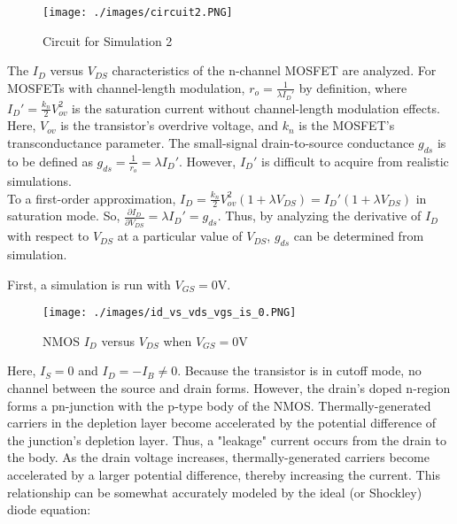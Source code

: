 \FloatBarrier

\begin{figure}[h!]
	\centering
	\texttt{[image: ./images/circuit2.PNG]}
	\caption{Circuit for Simulation 2}
	\label{fig:circuit2}
\end{figure}

\FloatBarrier

The $I_{D}$ versus $V_{DS}$ characteristics of the n-channel MOSFET are analyzed.
For MOSFETs with channel-length modulation, $r_{o} = \frac{1}{\lambda I_{D}'}$ by definition, where $I_{D}' = \frac{k_{n}}{2} V_{ov}^2$ is the saturation current without channel-length modulation effects.
Here, $V_{ov}$ is the transistor's overdrive voltage, and $k_{n}$ is the MOSFET's transconductance parameter.
The small-signal drain-to-source conductance $g_{ds}$ is to be defined as $g_{ds} = \frac{1}{r_{o}} = \lambda I_{D}'$.
However, $I_{D}'$ is difficult to acquire from realistic simulations. \\

To a first-order approximation, $I_{D} = \frac{k_{n}}{2} V_{ov}^2 ( 1 + \lambda V_{DS} ) = I_{D}' ( 1 + \lambda V_{DS} )$ in saturation mode.
So, $\frac{ \partial I_{D} }{ \partial V_{DS} } = \lambda I_{D}' = g_{ds}$.
Thus, by analyzing the derivative of $I_{D}$ with respect to $V_{DS}$ at a particular value of $V_{DS}$, $g_{ds}$ can be determined from simulation.

First, a simulation is run with $V_{GS} = 0$\si{\volt}.

\FloatBarrier

\begin{figure}[h!]
	\centering
	\texttt{[image: ./images/id\_vs\_vds\_vgs\_is\_0.PNG]}
	\caption{NMOS $I_{D}$ versus $V_{DS}$ when $V_{GS} = 0$\si{\volt}}
	\label{fig:id_vs_vds_vgs_is_0}
\end{figure}

\FloatBarrier

Here, $I_{S} = 0$ and $I_{D} = -I_{B} \neq 0$.
Because the transistor is in cutoff mode, no channel between the source and drain forms.
However, the drain's doped n-region forms a pn-junction with the p-type body of the NMOS.
Thermally-generated carriers in the depletion layer become accelerated by the potential difference of the junction's depletion layer.
Thus, a "leakage" current occurs from the drain to the body.
As the drain voltage increases, thermally-generated carriers become accelerated by a larger potential difference, thereby increasing the current.
This relationship can be somewhat accurately modeled by the ideal (or Shockley) diode equation:

